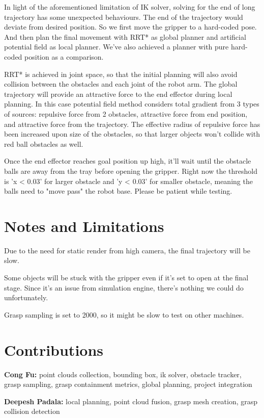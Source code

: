 \documentclass[
	english,
	accentcolor=11d,%
	type=intern,
	marginpar=false,
    logofile=media/PEARLTUDA.png
	]{tudapub}
\begin{document}
In light of the aforementioned limitation of IK solver, solving for the end of long trajectory has some unexpected behaviours. The end of the trajectory would deviate from desired position. So we first move the gripper to a hard-coded pose. And then plan the final movement with RRT* as global planner and artificial potential field as local planner. We've also achieved a planner with pure hard-coded position as a comparison.

RRT* is achieved in joint space, so that the initial planning will also avoid collision between the obstacles and each joint of the robot arm. The global trajectory will provide an attractive force to the end effector during local planning. In this case potential field method considers total gradient from 3 types of sources: repulsive force from 2 obstacles, attractive force from end position, and attractive force from the trajectory. The effective radius of repulsive force has been increased upon size of the obstacles, so that larger objects won't collide with red ball obstacles as well.

Once the end effector reaches goal position up high, it'll wait until the obstacle balls are away from the tray before opening the gripper. Right now the threshold is 'x < 0.03' for larger obstacle and 'y < 0.03' for smaller obstacle, meaning the balls need to "move pass" the robot base. Please be patient while testing. 

\section{Notes and Limitations}

Due to the need for static render from high camera, the final trajectory will be slow. 

Some objects will be stuck with the gripper even if it's set to open at the final stage. Since it's an issue from simulation engine, there's nothing we could do unfortunately.

Grasp sampling is set to 2000, so it might be slow to test on other machines.

\section{Contributions}

\noindent\textbf{Cong Fu:} point clouds collection, bounding box, ik solver, obstacle tracker, grasp sampling, grasp containment metrics, global planning, project integration

\noindent\textbf{Deepesh Padala:} local planning, point cloud fusion, grasp mesh creation, grasp collision detection
\end{document}
